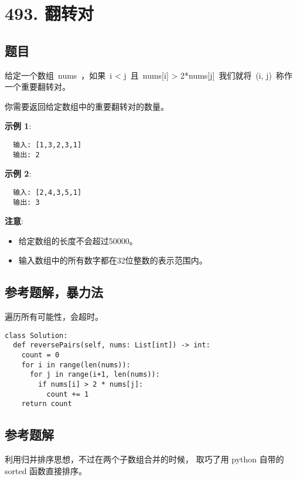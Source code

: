 \newpage
\section{493. 翻转对}
\label{leetcode:493}

\subsection{题目}

给定一个数组 nums ，如果 i < j 且 nums[i] > 2*nums[j] 我们就将 (i, j) 称作一个重要翻转对。

你需要返回给定数组中的重要翻转对的数量。

\textbf{示例 1}:

\begin{verbatim}
  输入: [1,3,2,3,1]
  输出: 2
\end{verbatim}

\textbf{示例 2}:

\begin{verbatim}
  输入: [2,4,3,5,1]
  输出: 3
\end{verbatim}

\textbf{注意}:

\begin{itemize}
  \item 给定数组的长度不会超过50000。
  \item 输入数组中的所有数字都在32位整数的表示范围内。
\end{itemize}

\subsection{参考题解，暴力法}

遍历所有可能性，会超时。

\begin{verbatim}
class Solution:
  def reversePairs(self, nums: List[int]) -> int:
    count = 0
    for i in range(len(nums)):
      for j in range(i+1, len(nums)):
        if nums[i] > 2 * nums[j]:
          count += 1
    return count
\end{verbatim}

\subsection{参考题解}

利用归并排序思想，不过在两个子数组合并的时候，
取巧了用 python 自带的 sorted 函数直接排序。

